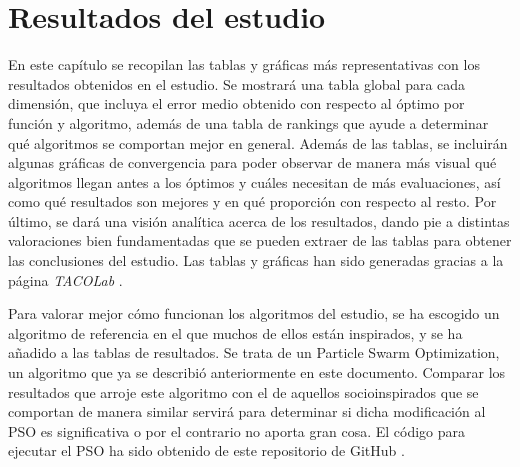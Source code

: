 \chapter{Resultados del estudio}

En este capítulo se recopilan las tablas y gráficas más representativas con los resultados obtenidos en el estudio. Se mostrará una tabla global para cada dimensión, que incluya el error medio obtenido con respecto al óptimo por función y algoritmo, además de una tabla de rankings que ayude a determinar qué algoritmos se comportan mejor en general. Además de las tablas, se incluirán algunas gráficas de convergencia para poder observar de manera más visual qué algoritmos llegan antes a los óptimos y cuáles necesitan de más evaluaciones, así como qué resultados son mejores y en qué proporción con respecto al resto. Por último, se dará una visión analítica acerca de los resultados, dando pie a distintas valoraciones bien fundamentadas que se pueden extraer de las tablas para obtener las conclusiones del estudio. Las tablas y gráficas han sido generadas gracias a la página \textit{TACOLab} \cite{tacolab}.

Para valorar mejor cómo funcionan los algoritmos del estudio, se ha escogido un algoritmo de referencia en el que muchos de ellos están inspirados, y se ha añadido a las tablas de resultados. Se trata de un Particle Swarm Optimization, un algoritmo que ya se describió anteriormente en este documento. Comparar los resultados que arroje este algoritmo con el de aquellos socioinspirados que se comportan de manera similar servirá para determinar si dicha modificación al PSO es significativa o por el contrario no aporta gran cosa. El código para ejecutar el PSO ha sido obtenido de este repositorio de GitHub \cite{pso-github}.

